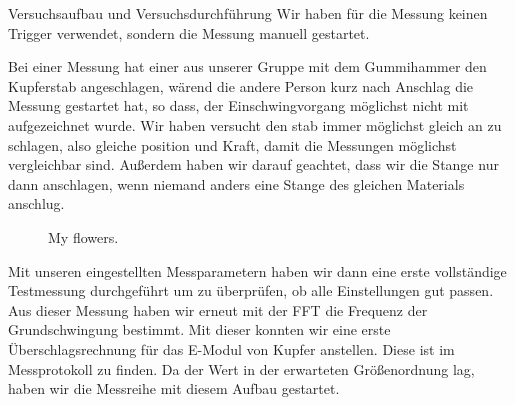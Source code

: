 \documentclass[twoside]{protokoll}
\begin{document}
\begin{aufgabe}{Versuchsaufbau und Versuchsdurchführung}
Wir haben für die Messung keinen Trigger verwendet, sondern die Messung manuell gestartet. 


Bei einer Messung hat einer aus unserer Gruppe mit dem Gummihammer den Kupferstab angeschlagen, wärend die andere Person kurz nach Anschlag die Messung gestartet hat, so dass, der Einschwingvorgang möglichst nicht mit aufgezeichnet wurde. Wir haben versucht den stab immer möglichst gleich an zu schlagen, also gleiche position und Kraft, damit die Messungen möglichst vergleichbar sind. Außerdem haben wir darauf geachtet, dass wir die Stange nur dann anschlagen, wenn niemand anders eine Stange des gleichen Materials anschlug.

\begin{figure}[!tbp]
  \centering
  \hfill
  \caption{My flowers.}
\end{figure}



Mit unseren eingestellten Messparametern haben wir dann eine erste vollständige Testmessung durchgeführt um zu überprüfen, ob alle Einstellungen gut passen. Aus dieser Messung haben wir erneut mit der FFT die Frequenz der Grundschwingung bestimmt. Mit dieser konnten wir eine erste Überschlagsrechnung für das E-Modul von Kupfer anstellen.
Diese ist im Messprotokoll zu finden. Da der Wert in der erwarteten Größenordnung lag, haben wir die Messreihe mit diesem Aufbau gestartet. 



\end{aufgabe}
\end{document}
